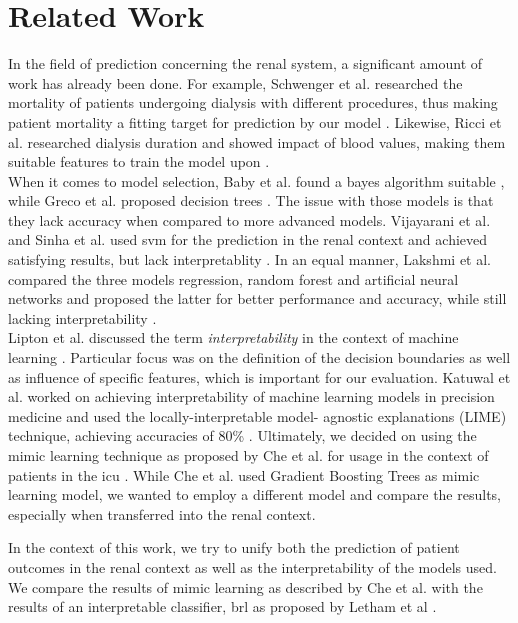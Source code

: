 \documentclass[conference,comsoc]{IEEEtran}
\begin{document}
\section{Related Work}
\label{sec:related}
In the field of prediction concerning the renal system, a significant amount of work has already been done.
For example, Schwenger et al. researched the mortality of patients undergoing dialysis with different procedures, thus making patient mortality a fitting target for prediction by our model \cite{Schwenger2012}.
Likewise, Ricci et al. researched dialysis duration and showed impact of blood values, making them suitable features to train the model upon \cite{Ricci2006}. \\
When it comes to model selection, Baby et al. found a bayes algorithm suitable \cite{Baby2015}, while Greco et al. proposed decision trees \cite{Greco2010}.
The issue with those models is that they lack accuracy when compared to more advanced models.
Vijayarani et al. and Sinha et al. used \gls{svm} for the prediction in the renal context and achieved satisfying results, but lack interpretablity \cite{Vijayarani2015} \cite{Sinha2015}.
In an equal manner, Lakshmi et al. compared the three models regression, random forest and artificial neural networks and proposed the latter for better performance and accuracy, while still lacking interpretability \cite{Lakshmi2014}. \\
Lipton et al. discussed the term \emph{interpretability} in the context of machine learning \cite{Lipton2016}. 
Particular focus was on the definition of the decision boundaries as well as influence of specific features, which is important for our evaluation.
Katuwal et al. worked on achieving interpretability of machine learning models in precision medicine and used the locally-interpretable model- agnostic explanations (LIME) technique, achieving accuracies of 80\% \cite{Katuwal2016}.
Ultimately, we decided on using the mimic learning technique as proposed by Che et al. for usage in the context of patients in the \gls{icu} \cite{Che2016}.
While Che et al. used Gradient Boosting Trees as mimic learning model, we wanted to employ a different model and compare the results, especially when transferred into the renal context.

In the context of this work, we try to unify both the prediction of patient outcomes in the renal context as well as the interpretability of the models used.
We compare the results of mimic learning as described by Che et al. with the results of an interpretable classifier, \gls{brl} as proposed by Letham et al \cite{Che2016} \cite{Letham2015}.
\end{document}
